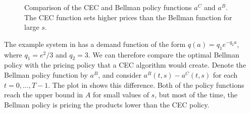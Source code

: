 \documentclass[main.tex]{subfiles}
\begin{document}
\begin{figure}[htbp]
  \caption{Comparison of the CEC and Bellman policy functions $a^C$ and
    $a^B$.
    The CEC function sets
    higher prices than the Bellman function for large $s$.
  }\label{fig:bellman_det_policy_difference}
\end{figure}

The example system in  has a demand
function of the form $q(a)=q_1e^{-q_2a}$, where $q_1=e^2/3$ and
$q_2=3$. We can therefore compare the optimal Bellman policy with the
pricing policy that a CEC algorithm would create.
Denote the Bellman policy function by $a^B$, and consider
$a^B(t,s)-a^C(t,s)$ for each $t=0,\dots,T-1$. The plot in
 shows this difference.
Both of the policy functions reach the upper bound in $A$ for small values
of $s$, but most of the time, the Bellman policy is pricing the products
lower than the CEC policy.
\end{document}
